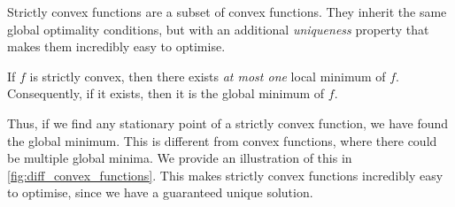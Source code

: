 Strictly convex functions are a subset of convex functions. They inherit the same global optimality conditions, but with an additional \textit{uniqueness} property that makes them incredibly easy to optimise.
\begin{definition}
    If $f$ is strictly convex, then there exists \textit{at most one} local minimum of $f$. Consequently, if it exists, then it is the global minimum of $f$.
\end{definition}
Thus, if we find any stationary point of a strictly convex function, we have found the global minimum. This is different from convex functions, where there could be multiple global minima. We provide an illustration of this in \cref{fig:diff_convex_functions}. This makes strictly convex functions incredibly easy to optimise, since we have a guaranteed unique solution.

